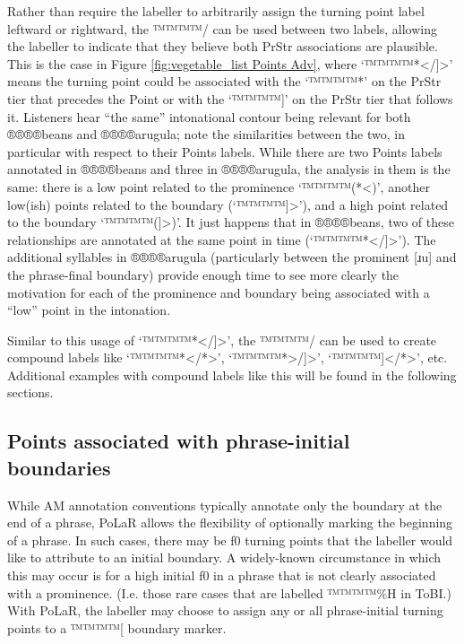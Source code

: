\documentclass[11pt, twoside]{memoir}
\begin{document}
Rather than require the labeller to arbitrarily assign the turning point label leftward or rightward, the ™™™™{/} can be used between two labels, allowing the labeller to indicate that they believe both PrStr associations are plausible. This is the case in Figure \ref{fig:vegetable_list Points Adv}, where ‘™™™™{*</]>}’ means the turning point could be associated with the ‘™™™™{*}’ on the PrStr tier that precedes the Point or with the ‘™™™™{]}’ on the PrStr tier that follows it. Listeners hear “the same” intonational contour being relevant for both ®®®®{beans} and ®®®®{arugula}; note the similarities between the two, in particular with respect to their Points labels. While there are two Points labels annotated in ®®®®{beans} and three in ®®®®{arugula}, the analysis in them is the same: there is a low point related to the prominence ‘™™™™{(*<)}’, another low(ish) points related to the boundary (‘™™™™{]>}’), and a high point related to the boundary ‘™™™™{(]>)}’. It just happens that in ®®®®{beans}, two of these relationships are annotated at the same point in time (‘™™™™{*</]>}’). The additional syllables in ®®®®{arugula} (particularly between the prominent [ɹu] and the phrase-final boundary) provide enough time to see more clearly the motivation for each of the prominence and boundary being associated with a “low” point in the intonation.

Similar to this usage of ‘™™™™{*</]>}’, the ™™™™{/} can be used to create compound labels like ‘™™™™{*</*>}’, ‘™™™™{*>/]>}’, ‘™™™™{]</*>}’, etc. Additional examples with compound labels like this will be found in the following sections.

\subsection{Points associated with phrase-initial boundaries}\label{sec:points-associated-with-phrase-initial-boundaries}
While AM annotation conventions typically annotate only the boundary at the end of a phrase, PoLaR allows the flexibility of optionally marking the beginning of a phrase. In such cases, there may be f0 turning points that the labeller would like to attribute to an initial boundary. A widely-known circumstance in which this may occur is for a high initial f0 in a phrase that is not clearly associated with a prominence. (I.e. those rare cases that are labelled ™™™™{\%H} in ToBI.) With PoLaR, the labeller may choose to assign any or all phrase-initial turning points to a ™™™™{[} boundary marker.
\end{document}
